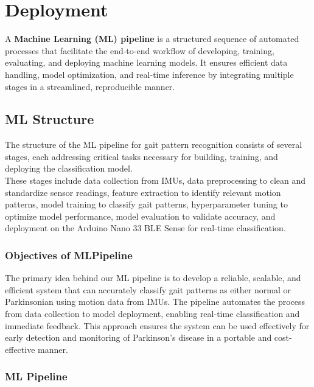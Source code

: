 


\chapter{Deployment}
A \textbf{Machine Learning (ML) pipeline} is a structured sequence of automated processes that facilitate the end-to-end workflow of developing, training, evaluating, and deploying machine learning models. It ensures efficient data handling, model optimization, and real-time inference by integrating multiple stages in a streamlined, reproducible manner\cite{Panebianco:2018}.
\section{ML Structure}
 The structure of the ML pipeline for gait pattern recognition consists of several stages, each addressing critical tasks necessary for building, training, and deploying the classification model. \\These stages include data collection from IMUs, data preprocessing to clean and standardize sensor readings, feature extraction to identify relevant motion patterns, model training to classify gait patterns, hyperparameter tuning to optimize model performance, model evaluation to validate accuracy, and deployment on the Arduino Nano 33 BLE Sense for real-time classification\cite{Panebianco:2018}.
\subsection{Objectives of MLPipeline}
The primary idea behind our ML pipeline is to develop a reliable, scalable, and efficient system that can accurately classify gait patterns as either normal or Parkinsonian using motion data from IMUs. The pipeline automates the process from data collection to model deployment, enabling real-time classification and immediate feedback. This approach ensures the system can be used effectively for early detection and monitoring of Parkinson's disease in a portable and cost-effective manner.\cite{Patel:2023}
\subsection{ML Pipeline}

